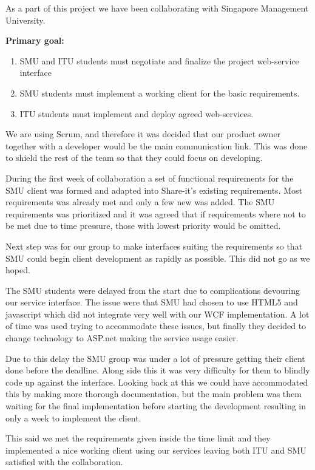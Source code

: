 \documentclass[../report.tex]{subfiles}
\begin{document}
\graphicspath{{img/}{../img/}}


As a part of this project we have been collaborating with Singapore Management University.

\textbf{Primary goal:}
\begin{enumerate}[label=\bfseries G\arabic*:]
\item SMU and ITU students must negotiate and finalize the project web-service interface
\item SMU students must implement a working client for the basic requirements.
\item ITU students must implement and deploy agreed web-services.
\end{enumerate}

We are using Scrum, and therefore it was decided that our product owner together with a developer would be the main communication link. This was done to shield the rest of the team so that they could focus on developing.

During the first week of collaboration a set of functional requirements for the SMU client was formed and adapted into Share-it's existing requirements. Most requirements was already met and only a few new was added. The SMU requirements was prioritized and it was agreed that if requirements where not to be met due to time pressure, those with lowest priority would be omitted.

Next step was for our group to make interfaces suiting the requirements so that SMU could begin client development as rapidly as possible. This did not go as we hoped.

The SMU students were delayed from the start due to complications devouring our service interface. The issue were that SMU had chosen to use HTML5 and javascript which did not integrate very well with our WCF implementation. A lot of time was used trying to accommodate these issues, but finally they decided to change technology to ASP.net making the service usage easier.

Due to this delay the SMU group was under a lot of pressure getting their client done before the deadline. Along side this it was very difficulty for them to blindly code up against the interface. Looking back at this we could have accommodated this by making more thorough documentation, but the main problem was them waiting for the final implementation before starting the development resulting in only a week to implement the client.

This said we met the requirements given inside the time limit and they implemented a nice working client using our services leaving both ITU and SMU satisfied with the collaboration.
\end{document}
